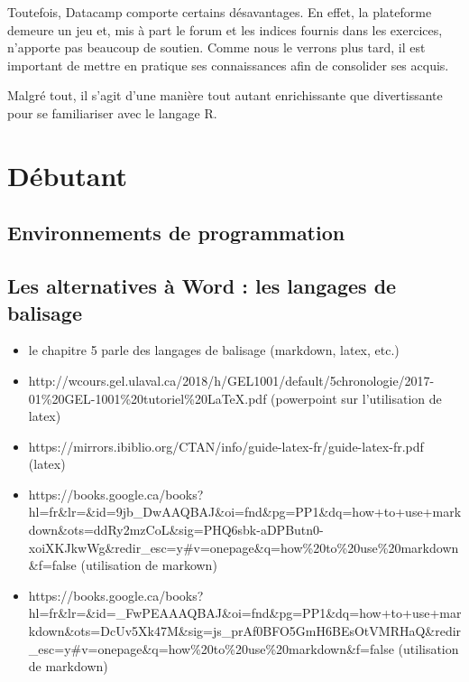 \documentclass[
  letterpaper,
]{scrbook}
\begin{document}
Toutefois, Datacamp comporte certains désavantages. En effet, la
plateforme demeure un jeu et, mis à part le forum et les indices fournis
dans les exercices, n'apporte pas beaucoup de soutien. Comme nous le
verrons plus tard, il est important de mettre en pratique ses
connaissances afin de consolider ses acquis.

Malgré tout, il s'agit d'une manière tout autant enrichissante que
divertissante pour se familiariser avec le langage R.

\hypertarget{duxe9butant}{%
\section{Débutant}\label{duxe9butant}}

\hypertarget{environnements-de-programmation}{%
\subsection{Environnements de
programmation}\label{environnements-de-programmation}}

\hypertarget{les-alternatives-uxe0-word-les-langages-de-balisage}{%
\subsection{Les alternatives à Word : les langages de
balisage}\label{les-alternatives-uxe0-word-les-langages-de-balisage}}

\begin{itemize}
\item
  le chapitre 5 parle des langages de balisage (markdown, latex, etc.)
\item
  http://wcours.gel.ulaval.ca/2018/h/GEL1001/default/5chronologie/2017-01\%20GEL-1001\%20tutoriel\%20LaTeX.pdf
  (powerpoint sur l'utilisation de latex)
\item
  https://mirrors.ibiblio.org/CTAN/info/guide-latex-fr/guide-latex-fr.pdf
  (latex)
\item
  https://books.google.ca/books?hl=fr\&lr=\&id=9jb\_DwAAQBAJ\&oi=fnd\&pg=PP1\&dq=how+to+use+markdown\&ots=ddRy2mzCoL\&sig=PHQ6sbk-aDPButn0-xoiXKJkwWg\&redir\_esc=y\#v=onepage\&q=how\%20to\%20use\%20markdown\&f=false
  (utilisation de markown)
\item
  https://books.google.ca/books?hl=fr\&lr=\&id=\_FwPEAAAQBAJ\&oi=fnd\&pg=PP1\&dq=how+to+use+markdown\&ots=DcUv5Xk47M\&sig=js\_prAf0BFO5GmH6BEsOtVMRHaQ\&redir\_esc=y\#v=onepage\&q=how\%20to\%20use\%20markdown\&f=false
  (utilisation de markdown)
\end{itemize}
\end{document}
